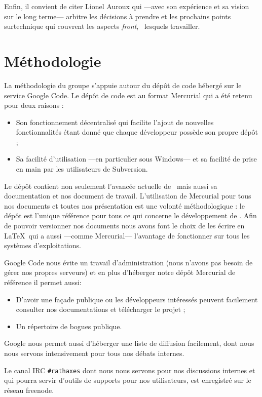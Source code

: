 \documentclass[francais]{rtxreport}
\begin{document}
Enfin, il convient de citer Lionel Auroux qui ---avec son expérience et sa vision
sur le long terme--- arbitre les décisions à prendre et les prochains points
surtechnique qui couvrent les aspects \emph{front}, \
lesquels travailler.

\section{Méthodologie}

La méthodologie du groupe s'appuie autour du dépôt de code hébergé sur le
service Google Code. Le dépôt de code est au format Mercurial qui a été retenu
pour deux raisons :
\begin{itemize}
\item Son fonctionnement décentralisé qui facilite l'ajout de nouvelles
fonctionnalités étant donné que chaque développeur possède son propre dépôt ;
\item Sa facilité d'utilisation ---en particulier sous Windows--- et sa facilité
de prise en main par les utilisateurs de Subversion.
\end{itemize}

Le dépôt contient non seulement l'avancée actuelle de \rtx\ mais aussi sa
documentation et nos document de travail. L'utilisation de Mercurial pour tous
nos documents et toutes nos présentation est une volonté méthodologique : le
dépôt est l'unique référence pour tous ce qui concerne le développement de \rtx.
Afin de pouvoir versionner nos documents nous avons font le choix de les écrire
en \LaTeX\ qui a aussi ---comme Mercurial--- l'avantage de fonctionner sur tous
les systèmes d'exploitations.

Google Code nous évite un travail d'administration (nous n'avons pas besoin de
gérer nos propres serveurs) et en plus d'héberger notre dépôt Mercurial de
référence il permet aussi:
\begin{itemize}
\item D'avoir une façade publique ou les développeurs intéressés peuvent
facilement consulter nos documentations et télécharger le projet ;
\item Un répertoire de bogues publique.
\end{itemize}
Google nous permet aussi d'héberger une liste de diffusion facilement, dont nous
nous servons intensivement pour tous nos débats internes.

Le canal IRC \texttt{\#rathaxes} dont nous nous servons pour nos discussions
internes et qui pourra servir d'outils de supports pour nos utilisateurs, est
enregistré sur le réseau freenode.
\end{document}
